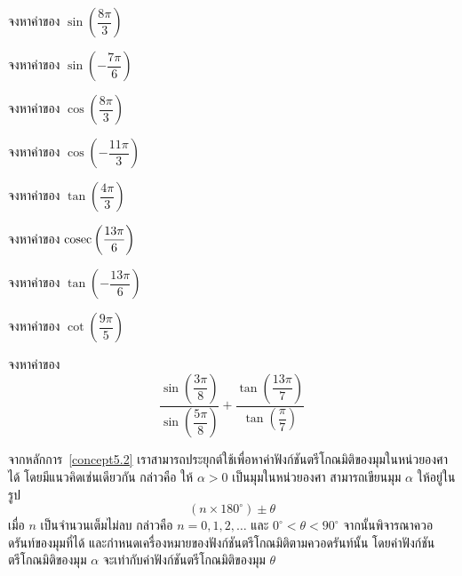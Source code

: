 \begin{examplebox}
จงหาค่าของ $\sin\left(\dfrac{8\pi}{3}\right)$
\end{examplebox}
\vspace{3cm}
\begin{examplebox}
จงหาค่าของ $\sin\left(-\dfrac{7\pi}{6}\right)$
\end{examplebox}
\vspace{3cm}
\begin{examplebox}
จงหาค่าของ $\cos\left(\dfrac{8\pi}{3}\right)$
\end{examplebox}
\vspace{3cm}
\begin{examplebox}
จงหาค่าของ $\cos\left(-\dfrac{11\pi}{3}\right)$
\end{examplebox}
\vspace{3cm}
\begin{examplebox}
จงหาค่าของ $\tan\left(\dfrac{4\pi}{3}\right)$
\end{examplebox}
\vspace{3cm}
\begin{examplebox}
จงหาค่าของ $\operatorname{cosec}\left(\dfrac{13\pi}{6}\right)$
\end{examplebox}
\vspace{3cm}
\begin{examplebox}
จงหาค่าของ $\tan\left(-\dfrac{13\pi}{6}\right)$
\end{examplebox}
\newpage
\begin{examplebox}
จงหาค่าของ $\cot\left(\dfrac{9\pi}{5}\right)$
\end{examplebox}
\vspace{3cm}
\begin{examplebox}
จงหาค่าของ 
\[\dfrac{\sin\left(\dfrac{3\pi}{8} \right)}{\sin\left(\dfrac{5\pi}{8} \right)}+ \dfrac{\tan\left(\dfrac{13\pi}{7}\right)}{\tan\left(\dfrac{\pi}{7} \right)}\]
\end{examplebox}
\newpage
\begin{observationbox}
จากหลักการ~\ref{concept5.2} เราสามารถประยุกต์ใช้เพื่อหาค่าฟังก์ชันตรีโกณมิติของมุมในหน่วยองศาได้ โดยมีแนวคิดเช่นเดียวกัน กล่าวคือ
ให้ $\alpha>0$ เป็นมุมในหน่วยองศา สามารถเขียนมุม $\alpha$ ให้อยู่ในรูป
\[
\left(n\times 180^{\circ}\right)\pm\theta
\]
เมื่อ $n$ เป็นจำนวนเต็มไม่ลบ กล่าวคือ $n=0,1,2,\ldots$ และ $0^{\circ}<\theta<90^{\circ}$
จากนั้นพิจารณาควอดรันท์ของมุมที่ได้ และกำหนดเครื่องหมายของฟังก์ชันตรีโกณมิติตามควอดรันท์นั้น โดยค่าฟังก์ชันตรีโกณมิติของมุม $\alpha$ จะเท่ากับค่าฟังก์ชันตรีโกณมิติของมุม $\theta$
\end{observationbox}


